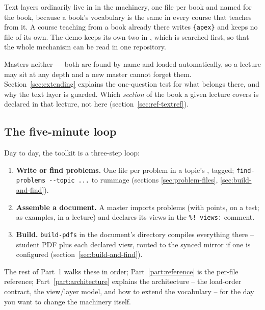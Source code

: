 Text layers ordinarily live in  in the machinery, one file per book and named for the book, because a book's vocabulary is the same in every course that teaches from it.
A course teaching from a book already there writes \texttt{\{apex\}} and keeps no file of its own.
The demo keeps its own two in , which is searched first, so that the whole mechanism can be read in one repository.

Masters  neither --- both are found by name and loaded
automatically, so a lecture may sit at any depth and a new master cannot
forget them. Section~\ref{sec:extending} explains the one-question test for
what belongs there, and why the text layer is guarded. Which \emph{section}
of the book a given lecture covers is declared in that lecture, not here
(section~\ref{sec:ref-textref}).

\subsection{The five-minute loop}

Day to day, the toolkit is a three-step loop:

\begin{enumerate}
  \item \textbf{Write or find problems.} One file per problem in a topic's
    , tagged; \texttt{find-problems -{}-topic ...} to
    rummage (sections \ref{sec:problem-files}, \ref{sec:build-and-find}).
  \item \textbf{Assemble a document.} A master imports problems (with
    points, on a test; as examples, in a lecture) and declares its views
    in the \texttt{\%! views:} comment.
  \item \textbf{Build.} \texttt{build-pdfs} in the document's directory
    compiles everything there -- student PDF plus each declared view,
    routed to the synced mirror if one is configured
    (section~\ref{sec:build-and-find}).
\end{enumerate}

The rest of Part~1 walks these in order; Part~\ref{part:reference} is the
per-file reference; Part~\ref{part:architecture} explains the architecture
-- the load-order contract, the view/layer model, and how to extend the
vocabulary -- for the day you want to change the machinery itself.
